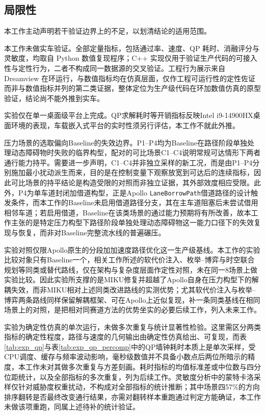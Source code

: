 \documentclass[a4paper,11pt]{ctexart}
\theoremstyle{definition}
\begin{document}
\subsection{局限性}
\label{subsec:exp_limitations}

本工作主动声明若干验证边界上的不足，以划清结论的适用范围。

本工作未做实车验证。全部定量指标，包括通过率、速度、QP 耗时、消融评分与灵敏度，均取自 Python 数值复现程序；C++ 实现仅用于验证生产代码的可接入性与定性行为，二者不构成同一数据源的交叉验证。工程行为展示来自 Dreamview 在环运行，与数值指标均在仿真层面，仅作工程可运行性的定性佐证而非与数值指标并列的第二类证据，整体定位为生产级代码在环加数值仿真的原型验证，结论尚不能外推到实车。

实验仅在单一桌面级平台上完成。QP求解耗时等开销指标反映Intel i9-14900HX桌面环境的表现，车载嵌入式平台的实时性须另行评估，本工作不就此外推。

压力场景的选取偏向Baseline的失效边界。P1--P4均为Baseline在路径阶段单独处理动态障碍物时失败的临界构型，配对的可比场景C1--C4说明常规可达情形下两者通行能力持平。需要进一步声明，C1--C4并非独立采样的新工况，而是由P1--P4分别施加最小扰动派生而来，目的是在控制变量下观察放宽到可达后的连续指标，因此可比场景的持平结论是构造受限的对照而非独立证据，其外部效度相应受限。此外，P4为单车道封闭加借道构型，正是Apollo \texttt{LaneBorrowPath}借道路径的设计触发条件，而本工作的Baseline未启用借道路径分支，其在主车道阻塞后未尝试借用相邻车道；若启用借道，Baseline在该类场景的通过能力预期将有所改善，故本工作主张的是特定压力构型下路径阶段单独处理动态障碍物这一能力口径下的失效复现与恢复，而非对Baseline完整流水线的普遍碾压。

实验对照仅限Apollo原生的分段加加速度路径优化这一生产级基线。本工作的实验比较对象只有Baseline一个，相关工作所述的软代价注入、枚举--博弈与时空联合规划等同类或替代路线，仅在架构与复杂度层面作定性对照，未在同一8场景上做实验比较。因此实验所支撑的是MIKU修复并超越了Apollo自身在压力构型下的解耦失效，而非MIKU相对上述同类改进路线的实测优势；尤其软代价注入与枚举--博弈两条路线同样保留解耦框架、可在Apollo上近似复现，补一条同类基线在相同场景上的对照，是把相对同赛道方法的优势坐实的必要后续工作，列入未来工作。

实验为确定性仿真的单次运行，未做多次重复与统计显著性检验。这里需区分两类指标的确定性程度，路径与速度的几何输出由确定性仿真给出、可复现，而表\ref{tab:exp_qp}与表\ref{tab:exp_qp_percomp}中的QP墙钟耗时本质上是单次采样，受CPU调度、缓存与频率波动影响，毫秒级数值并不具备小数点后两位所暗示的精度，本工作未对其做多次重复与方差刻画。耗时指标的均值标准差或中位数与四分位距统计，以及全部指标的多次重复，列为后续工作。灵敏度分析中的蒙特卡洛采样仅针对威胁度权重扰动，不构成对全部指标的统计推断；其中场景四57\%的方向排序翻转是否最终改变通行结果，亦需对翻转样本重跑通过判定方能确证，本工作未做该项重跑，同属上述待补的统计验证。
\end{document}
